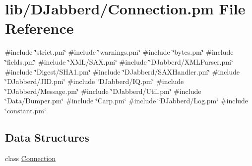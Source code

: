 \hypertarget{_connection_8pm}{
\section{lib/\-D\-Jabberd/\-Connection.pm \-File \-Reference}
\label{_connection_8pm}
}
{\ttfamily \#include \char`\"{}strict.\-pm\char`\"{}}\*
{\ttfamily \#include \char`\"{}warnings.\-pm\char`\"{}}\*
{\ttfamily \#include \char`\"{}bytes.\-pm\char`\"{}}\*
{\ttfamily \#include \char`\"{}fields.\-pm\char`\"{}}\*
{\ttfamily \#include \char`\"{}\-X\-M\-L/\-S\-A\-X.\-pm\char`\"{}}\*
{\ttfamily \#include \char`\"{}\-D\-Jabberd/\-X\-M\-L\-Parser.\-pm\char`\"{}}\*
{\ttfamily \#include \char`\"{}\-Digest/\-S\-H\-A1.\-pm\char`\"{}}\*
{\ttfamily \#include \char`\"{}\-D\-Jabberd/\-S\-A\-X\-Handler.\-pm\char`\"{}}\*
{\ttfamily \#include \char`\"{}\-D\-Jabberd/\-J\-I\-D.\-pm\char`\"{}}\*
{\ttfamily \#include \char`\"{}\-D\-Jabberd/\-I\-Q.\-pm\char`\"{}}\*
{\ttfamily \#include \char`\"{}\-D\-Jabberd/\-Message.\-pm\char`\"{}}\*
{\ttfamily \#include \char`\"{}\-D\-Jabberd/\-Util.\-pm\char`\"{}}\*
{\ttfamily \#include \char`\"{}\-Data/\-Dumper.\-pm\char`\"{}}\*
{\ttfamily \#include \char`\"{}\-Carp.\-pm\char`\"{}}\*
{\ttfamily \#include \char`\"{}\-D\-Jabberd/\-Log.\-pm\char`\"{}}\*
{\ttfamily \#include \char`\"{}constant.\-pm\char`\"{}}\*
\subsection*{\-Data \-Structures}
\begin{DoxyCompactItemize}
\item 
class \hyperlink{class_d_jabberd_1_1_connection}{\-Connection}
\end{DoxyCompactItemize}
